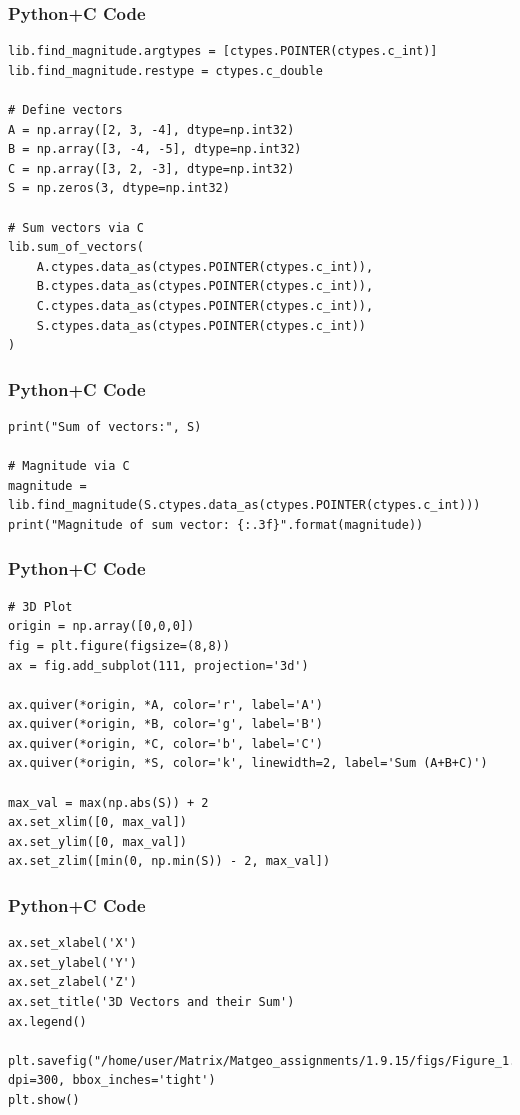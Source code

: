 \documentclass{beamer}
\begin{document}
\begin{frame}[fragile]
    \frametitle{Python+C Code}
    \begin{lstlisting}
lib.find_magnitude.argtypes = [ctypes.POINTER(ctypes.c_int)]
lib.find_magnitude.restype = ctypes.c_double

# Define vectors
A = np.array([2, 3, -4], dtype=np.int32)
B = np.array([3, -4, -5], dtype=np.int32)
C = np.array([3, 2, -3], dtype=np.int32)
S = np.zeros(3, dtype=np.int32)

# Sum vectors via C
lib.sum_of_vectors(
    A.ctypes.data_as(ctypes.POINTER(ctypes.c_int)),
    B.ctypes.data_as(ctypes.POINTER(ctypes.c_int)),
    C.ctypes.data_as(ctypes.POINTER(ctypes.c_int)),
    S.ctypes.data_as(ctypes.POINTER(ctypes.c_int))
)
    \end{lstlisting}
\end{frame}

\begin{frame}[fragile]
    \frametitle{Python+C Code}
    \begin{lstlisting}
print("Sum of vectors:", S)

# Magnitude via C
magnitude = lib.find_magnitude(S.ctypes.data_as(ctypes.POINTER(ctypes.c_int)))
print("Magnitude of sum vector: {:.3f}".format(magnitude))
    \end{lstlisting}
\end{frame}

\begin{frame}[fragile]
    \frametitle{Python+C Code}
    \begin{lstlisting}
# 3D Plot
origin = np.array([0,0,0])
fig = plt.figure(figsize=(8,8))
ax = fig.add_subplot(111, projection='3d')

ax.quiver(*origin, *A, color='r', label='A')
ax.quiver(*origin, *B, color='g', label='B')
ax.quiver(*origin, *C, color='b', label='C')
ax.quiver(*origin, *S, color='k', linewidth=2, label='Sum (A+B+C)')

max_val = max(np.abs(S)) + 2
ax.set_xlim([0, max_val])
ax.set_ylim([0, max_val])
ax.set_zlim([min(0, np.min(S)) - 2, max_val])
    \end{lstlisting}
\end{frame}
\begin{frame}[fragile]
    \frametitle{Python+C Code}
    \begin{lstlisting}
ax.set_xlabel('X')
ax.set_ylabel('Y')
ax.set_zlabel('Z')
ax.set_title('3D Vectors and their Sum')
ax.legend()

plt.savefig("/home/user/Matrix/Matgeo_assignments/1.9.15/figs/Figure_1.png", dpi=300, bbox_inches='tight')
plt.show()

    \end{lstlisting}
\end{frame}
\end{document}
